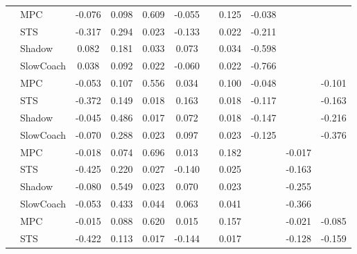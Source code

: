 \begin{tabular}{|l|l|*{9}{c|}}
\midrule
[True, True, True, True, False, True, True, False, False] & MPC &   -0.076 &     0.098 &     0.609 & -0.055 &     &  0.125 &  -0.038 &      &       \\
                                                           & STS &   -0.317 &     0.294 &     0.023 & -0.133 &     &  0.022 &  -0.211 &      &       \\
                                                           & Shadow &    0.082 &     0.181 &     0.033 &  0.073 &     &  0.034 &  -0.598 &      &       \\
                                                           & SlowCoach &    0.038 &     0.092 &     0.022 & -0.060 &     &  0.022 &  -0.766 &      &       \\
\midrule
[True, True, True, True, False, True, True, False, True] & MPC &   -0.053 &     0.107 &     0.556 &  0.034 &     &  0.100 &  -0.048 &      &   -0.101 \\
                                                           & STS &   -0.372 &     0.149 &     0.018 &  0.163 &     &  0.018 &  -0.117 &      &   -0.163 \\
                                                           & Shadow &   -0.045 &     0.486 &     0.017 &  0.072 &     &  0.018 &  -0.147 &      &   -0.216 \\
                                                           & SlowCoach &   -0.070 &     0.288 &     0.023 &  0.097 &     &  0.023 &  -0.125 &      &   -0.376 \\
\midrule
[True, True, True, True, False, True, False, True, False] & MPC &   -0.018 &     0.074 &     0.696 &  0.013 &     &  0.182 &      &  -0.017 &       \\
                                                           & STS &   -0.425 &     0.220 &     0.027 & -0.140 &     &  0.025 &      &  -0.163 &       \\
                                                           & Shadow &   -0.080 &     0.549 &     0.023 &  0.070 &     &  0.023 &      &  -0.255 &       \\
                                                           & SlowCoach &   -0.053 &     0.433 &     0.044 &  0.063 &     &  0.041 &      &  -0.366 &       \\
\midrule
[True, True, True, True, False, True, False, True, True] & MPC &   -0.015 &     0.088 &     0.620 &  0.015 &     &  0.157 &      &  -0.021 &   -0.085 \\
                                                           & STS &   -0.422 &     0.113 &     0.017 & -0.144 &     &  0.017 &      &  -0.128 &   -0.159 \\

\end{tabular}
